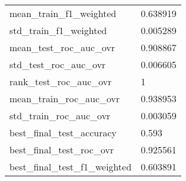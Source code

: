 \begin{tabular}{ll}
mean\_train\_f1\_weighted        &                                           0.638919 \\
std\_train\_f1\_weighted         &                                           0.005289 \\
mean\_test\_roc\_auc\_ovr         &                                           0.908867 \\
std\_test\_roc\_auc\_ovr          &                                           0.006605 \\
rank\_test\_roc\_auc\_ovr         &                                                  1 \\
mean\_train\_roc\_auc\_ovr        &                                           0.938953 \\
std\_train\_roc\_auc\_ovr         &                                           0.003059 \\
best\_final\_test\_accuracy      &                                              0.593 \\
best\_final\_test\_roc\_ovr       &                                           0.925561 \\
best\_final\_test\_f1\_weighted   &                                           0.603891 \\
\bottomrule
\end{tabular}
